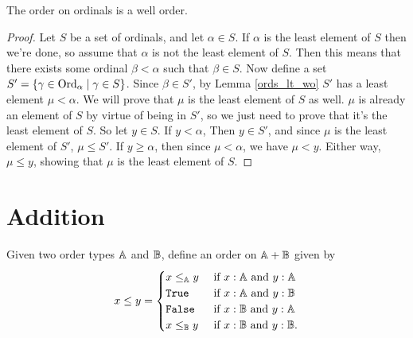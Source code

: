 \documentclass[../../math.tex]{subfiles}
\begin{document}
\begin{instance}
    The order on ordinals is a well order.
\end{instance}
\begin{proof}
    Let $S$ be a set of ordinals, and let $\alpha \in S$.  If $\alpha$ is the
    least element of $S$ then we're done, so assume that $\alpha$ is not the
    least element of $S$.  Then this means that there exists some ordinal $\beta
    < \alpha$ such that $\beta \in S$.  Now define a set $S' = \{\gamma \in
    \operatorname{Ord}_\alpha \mid \gamma \in S\}$.  Since $\beta \in S'$, by Lemma
    \ref{ords_lt_wo} $S'$ has a least element $\mu < \alpha$.  We will prove
    that $\mu$ is the least element of $S$ as well.  $\mu$ is already an element
    of $S$ by virtue of being in $S'$, so we just need to prove that it's the
    least element of $S$.  So let $y \in S$.  If $y < \alpha$, Then $y \in S'$,
    and since $\mu$ is the least element of $S'$, $\mu \leq S'$.  If $y \geq
    \alpha$, then since $\mu < \alpha$, we have $\mu < y$.  Either way, $\mu
    \leq y$, showing that $\mu$ is the least element of $S$.
\end{proof}

\section{Addition}

\begin{definition}
    Given two order types $\mathbb{A}$ and $\mathbb{B}$, define an order on $\mathbb{A} + \mathbb{B}$ given by
    \[
        x \leq y =
        \begin{cases}
            x \leq_\A y  &\text{ if $x : \A$ and $y : \A$} \\
            \verb|True|  &\text{ if $x : \A$ and $y : \B$} \\
            \verb|False| &\text{ if $x : \B$ and $y : \A$} \\
            x \leq_\B y  &\text{ if $x : \B$ and $y : \B$.}
        \end{cases}
    \]
\end{definition}
\end{document}

